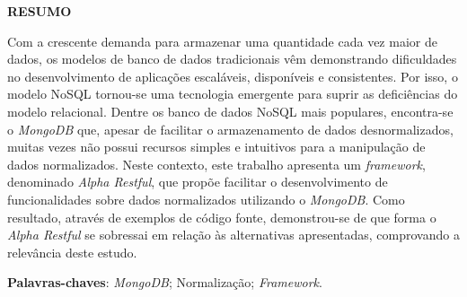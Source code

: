 \vfill
\begin{center}
{\textbf{RESUMO}\\}
\end{center}
\noindent

Com a crescente demanda para armazenar uma quantidade cada vez maior de dados, os modelos de banco de dados tradicionais vêm demonstrando dificuldades no desenvolvimento de aplicações escaláveis, disponíveis e consistentes. Por isso, o modelo NoSQL tornou-se uma tecnologia emergente para suprir as deficiências do modelo relacional. Dentre os banco de dados NoSQL mais populares, encontra-se o \textit{MongoDB} que, apesar de facilitar o armazenamento de dados desnormalizados, muitas vezes não possui recursos simples e intuitivos para a manipulação de dados normalizados. Neste contexto, este trabalho apresenta um \textit{framework}, denominado \textit{Alpha Restful}, que propõe facilitar o desenvolvimento de funcionalidades sobre dados normalizados utilizando o \textit{MongoDB}. Como resultado, através de exemplos de código fonte, demonstrou-se de que forma o \textit{Alpha Restful} se sobressai em relação às alternativas apresentadas, comprovando a relevância deste estudo.

\vspace{\onelineskip}
 \noindent
 \textbf{Palavras-chaves}: \textit{MongoDB}; Normalização; \textit{Framework}.
